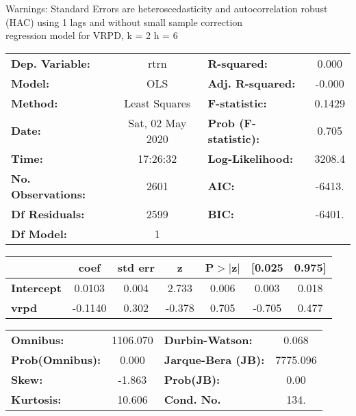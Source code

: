 Warnings: \newline
 [1] Standard Errors are heteroscedasticity and autocorrelation robust (HAC) using 1 lags and without small sample correction\\ 

regression model for VRPD, k = 2 h = 6\begin{center}
\begin{tabular}{lclc}
\toprule
\textbf{Dep. Variable:}    &       rtrn       & \textbf{  R-squared:         } &     0.000   \\
\textbf{Model:}            &       OLS        & \textbf{  Adj. R-squared:    } &    -0.000   \\
\textbf{Method:}           &  Least Squares   & \textbf{  F-statistic:       } &    0.1429   \\
\textbf{Date:}             & Sat, 02 May 2020 & \textbf{  Prob (F-statistic):} &    0.705    \\
\textbf{Time:}             &     17:26:32     & \textbf{  Log-Likelihood:    } &    3208.4   \\
\textbf{No. Observations:} &        2601      & \textbf{  AIC:               } &    -6413.   \\
\textbf{Df Residuals:}     &        2599      & \textbf{  BIC:               } &    -6401.   \\
\textbf{Df Model:}         &           1      & \textbf{                     } &             \\
\bottomrule
\end{tabular}
\begin{tabular}{lcccccc}
                   & \textbf{coef} & \textbf{std err} & \textbf{z} & \textbf{P$> |$z$|$} & \textbf{[0.025} & \textbf{0.975]}  \\
\midrule
\textbf{Intercept} &       0.0103  &        0.004     &     2.733  &         0.006        &        0.003    &        0.018     \\
\textbf{vrpd}      &      -0.1140  &        0.302     &    -0.378  &         0.705        &       -0.705    &        0.477     \\
\bottomrule
\end{tabular}
\begin{tabular}{lclc}
\textbf{Omnibus:}       & 1106.070 & \textbf{  Durbin-Watson:     } &    0.068  \\
\textbf{Prob(Omnibus):} &   0.000  & \textbf{  Jarque-Bera (JB):  } & 7775.096  \\
\textbf{Skew:}          &  -1.863  & \textbf{  Prob(JB):          } &     0.00  \\
\textbf{Kurtosis:}      &  10.606  & \textbf{  Cond. No.          } &     134.  \\
\bottomrule
\end{tabular}
\end{center}

